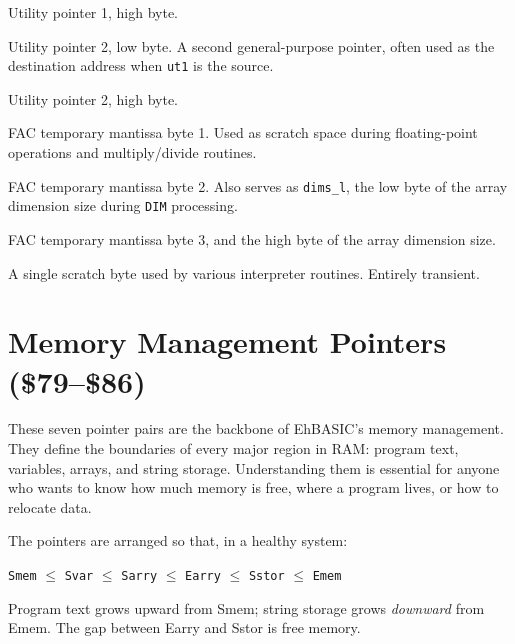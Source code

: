 Utility pointer 1, high byte.


Utility pointer 2, low byte.  A second general-purpose pointer, often used as
the destination address when \texttt{ut1} is the source.


Utility pointer 2, high byte.


FAC temporary mantissa byte 1.  Used as scratch space during floating-point
operations and multiply/divide routines.


FAC temporary mantissa byte 2.  Also serves as \texttt{dims\_l}, the low byte
of the array dimension size during \texttt{DIM} processing.


FAC temporary mantissa byte 3, and the high byte of the array dimension size.


A single scratch byte used by various interpreter routines.  Entirely
transient.

\section{Memory Management Pointers (\$79--\$86)}

These seven pointer pairs are the backbone of EhBASIC's memory management.
They define the boundaries of every major region in RAM: program text,
variables, arrays, and string storage.  Understanding them is essential for
anyone who wants to know how much memory is free, where a program lives, or
how to relocate data.

The pointers are arranged so that, in a healthy system:

\begin{center}
\texttt{Smem} $\leq$ \texttt{Svar} $\leq$ \texttt{Sarry} $\leq$
\texttt{Earry} $\leq$ \texttt{Sstor} $\leq$ \texttt{Emem}
\end{center}

Program text grows upward from Smem; string storage grows \emph{downward} from
Emem.  The gap between Earry and Sstor is free memory.

